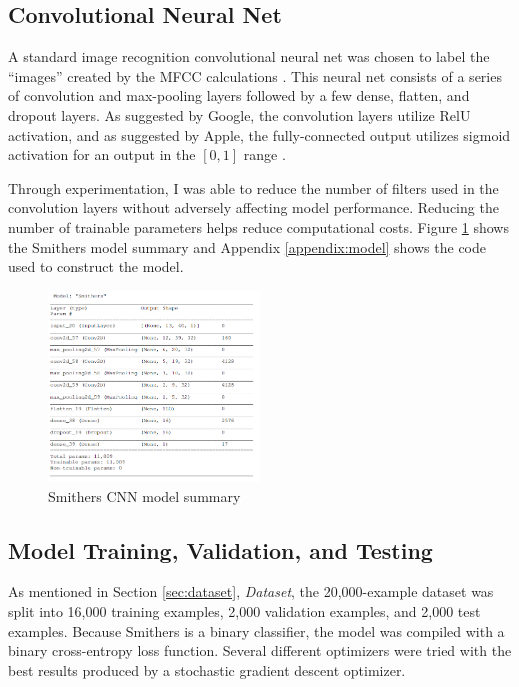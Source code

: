 \documentclass[conference]{IEEEtran}
\begin{document}
\subsection{Convolutional Neural Net}

A standard image recognition convolutional neural net was chosen to label the ``images''
created by the MFCC calculations \cite{hymel}.
This neural net consists of a series of convolution and max-pooling layers
followed by a few dense, flatten, and dropout layers.
As suggested by Google, the convolution layers utilize RelU activation,
and as suggested by Apple, the fully-connected output utilizes sigmoid activation
for an output in the $[0,1]$ range \cite{smallfoot} \cite{Efficient}.

Through experimentation, I was able to reduce the number of filters 
used in the convolution layers without adversely affecting model performance.
Reducing the number of trainable parameters helps reduce computational costs.
Figure \ref{fig:cnn} shows the Smithers model summary
and Appendix \ref{appendix:model} shows the code used to construct the model.

\begin{figure}[htbp]
    \centerline{\includegraphics[width=0.5\textwidth]{figs/cnn.png}}
    \caption{Smithers CNN model summary}
    \label{fig:cnn}
\end{figure}

\subsection{Model Training, Validation, and Testing}
As mentioned in Section \ref{sec:dataset}, \textit{Dataset},
the 20,000-example dataset was split into 16,000 training examples,
2,000 validation examples, and 2,000 test examples.
Because Smithers is a binary classifier, the model was compiled
with a binary cross-entropy loss function.
Several different optimizers were tried with the best results 
produced by a stochastic gradient descent optimizer.
\end{document}
